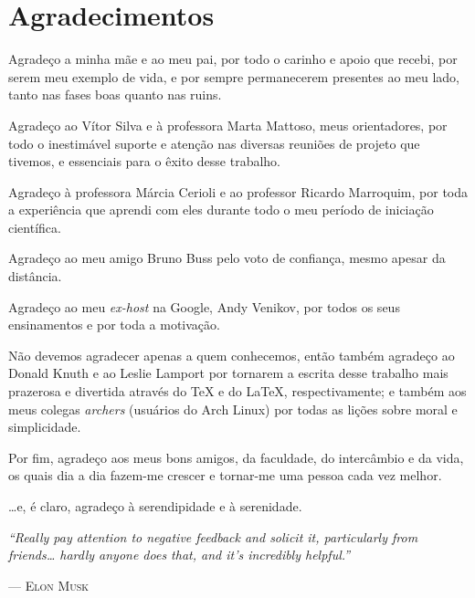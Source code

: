 
\dedication{Dedico esse trabalho aos meus pais, que sempre me apoiaram em tudo o que realizei.}

\chapter*{Agradecimentos}

Agradeço a minha mãe e ao meu pai, por todo o carinho e apoio que recebi, por serem meu exemplo de vida, e por sempre permanecerem presentes ao meu lado, tanto nas fases boas quanto nas ruins.

Agradeço ao Vítor Silva e à professora Marta Mattoso, meus orientadores, por todo o inestimável suporte e atenção nas diversas reuniões de projeto que tivemos, e essenciais para o êxito desse trabalho.

Agradeço à professora Márcia Cerioli e ao professor Ricardo Marroquim, por toda a experiência que aprendi com eles durante todo o meu período de iniciação científica.

Agradeço ao meu amigo Bruno Buss pelo voto de confiança, mesmo apesar da distância.

Agradeço ao meu \textit{ex-host} na Google, Andy Venikov, por todos os seus ensinamentos e por toda a motivação.

Não devemos agradecer apenas a quem conhecemos, então também agradeço ao Donald Knuth e ao Leslie Lamport por tornarem a escrita desse trabalho mais prazerosa e divertida através do \TeX{} e do \LaTeX{}, respectivamente; e também aos meus colegas \textit{archers} (usuários do Arch Linux) por todas as lições sobre moral e simplicidade.

Por fim, agradeço aos meus bons amigos, da faculdade, do intercâmbio e da vida, os quais dia a dia fazem-me crescer e tornar-me uma pessoa cada vez melhor.

\ldots{}e, é claro, agradeço à serendipidade e à serenidade.

\begin{center}
\end{center}

\vfill

\epigraph{\textit{``Really pay attention to negative feedback and solicit it, particularly from friends\ldots{} hardly anyone does that, and it's incredibly helpful.''}}{--- \textsc{Elon Musk}}
